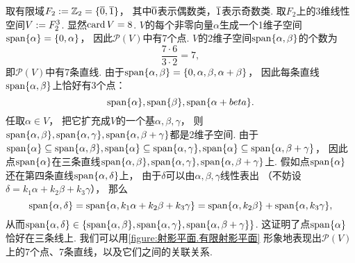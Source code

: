 \begin{example}
取有限域\(F_2 \defeq \mathbb{Z}_2 = \{\EquivalenceClassO{0},\EquivalenceClassO{1}\}\)，
其中\(\EquivalenceClassO{0}\)表示偶数类，\(\EquivalenceClassO{1}\)表示奇数类.
取\(F_2\)上的3维线性空间\(V := F_2^3\).
显然\(\operatorname{card} V = 8\).
\(V\)的每个非零向量\(\alpha\)生成一个1维子空间\(\operatorname{span}\{\alpha\} = \{0,\alpha\}\)，
因此\(\mathcal{P}(V)\)中有7个点.
\(V\)的2维子空间\(\operatorname{span}\{\alpha,\beta\}\)的个数为\begin{equation*}
	\frac{7\cdot6}{3\cdot2} = 7,
\end{equation*}
即\(\mathcal{P}(V)\)中有7条直线.
由于\(
	\operatorname{span}\{\alpha,\beta\}
	= \{0,\alpha,\beta,\alpha+\beta\}
\)，
因此每条直线\(\operatorname{span}\{\alpha,\beta\}\)上恰好有3个点：\begin{equation*}
	\operatorname{span}\{\alpha\},
	\operatorname{span}\{\beta\},
	\operatorname{span}\{\alpha+beta\}.
\end{equation*}
任取\(\alpha \in V\)，
把它扩充成\(V\)的一个基\(\alpha,\beta,\gamma\)，
则\(
	\operatorname{span}\{\alpha,\beta\},
	\operatorname{span}\{\alpha,\gamma\},
	\operatorname{span}\{\alpha,\beta+\gamma\}
\)都是2维子空间.
由于\(
	\operatorname{span}\{\alpha\} \subseteq \operatorname{span}\{\alpha,\beta\},
	\operatorname{span}\{\alpha\} \subseteq \operatorname{span}\{\alpha,\gamma\},
	\operatorname{span}\{\alpha\} \subseteq \operatorname{span}\{\alpha,\beta+\gamma\}
\)，
因此点\(\operatorname{span}\{\alpha\}\)在三条直线\(
	\operatorname{span}\{\alpha,\beta\},
	\operatorname{span}\{\alpha,\gamma\},
	\operatorname{span}\{\alpha,\beta+\gamma\}
\)上.
假如点\(\operatorname{span}\{\alpha\}\)还在第四条直线\(\operatorname{span}\{\alpha,\delta\}\)上，
由于\(\delta\)可以由\(\alpha,\beta,\gamma\)线性表出
（不妨设\(\delta = k_1 \alpha + k_2 \beta + k_3 \gamma\)），
那么\begin{equation*}
	\operatorname{span}\{\alpha,\delta\}
	= \operatorname{span}\{\alpha,k_1 \alpha + k_2 \beta + k_3 \gamma\}
	= \operatorname{span}\{\alpha,k_2 \beta\} + \operatorname{span}\{\alpha,k_3 \gamma\},
\end{equation*}
从而\(
	\operatorname{span}\{\alpha,\delta\}
	\in
	\{
		\operatorname{span}\{\alpha,\beta\},
		\operatorname{span}\{\alpha,\gamma\},
		\operatorname{span}\{\alpha,\beta+\gamma\}
	\}
\).
这证明了点\(\operatorname{span}\{\alpha\}\)恰好在三条线上.
我们可以用\cref{figure:射影平面.有限射影平面}
形象地表现出\(\mathcal{P}(V)\)上的7个点、7条直线，以及它们之间的关联关系.
\begin{figure}[hbt]
	\centering
\end{figure}
\end{example}
